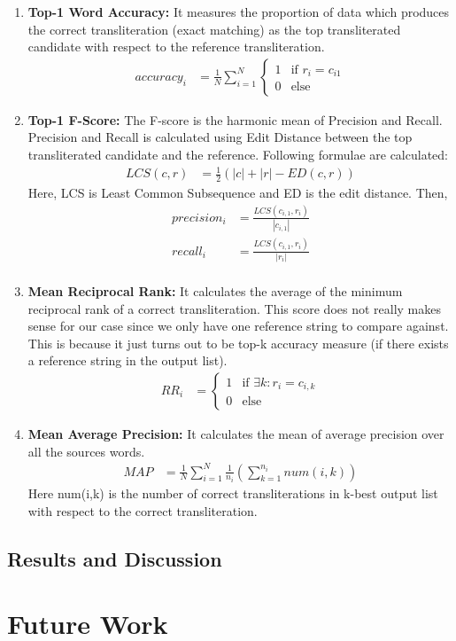 \documentclass[11pt,a4paper]{article}
\begin{document}
\begin{enumerate}
\item \textbf{Top-1 Word Accuracy: } It measures the proportion of data which produces the correct transliteration (exact matching) as the top transliterated candidate with respect to the reference transliteration.
\begin{align*}
	accuracy_i & = \frac{1}{N}\sum_{i=1}^{N}
							\begin{cases}
								1 & \text{if }r_i = c_{i1}\\
								0 & \text{else}
							\end{cases}
\end{align*}
\item \textbf{Top-1 F-Score: } The F-score is the harmonic mean of Precision and Recall. Precision and Recall is calculated using Edit Distance between the top transliterated candidate and the reference. Following formulae are calculated:
\begin{align*}
	LCS(c,r) & = \frac{1}{2}(|c| + |r| - ED(c,r))
\end{align*}
Here, LCS is Least Common Subsequence and ED is the edit distance. Then,
\begin{align*}
	precision_i & = \frac{LCS(c_{i,1}, r_i)}{|c_{i,1}|} \\
	recall_i & = \frac{LCS(c_{i,1}, r_i)}{|r_{i}|} \\
\end{align*}

\item \textbf{Mean Reciprocal Rank: } It calculates the average of the minimum reciprocal rank of a correct transliteration. This score does not really makes sense for our case since we only have one reference string to compare against. This is because it just turns out to be top-k accuracy measure (if there exists a reference string in the output list).
\begin{align*}
	RR_i & = 
		\begin{cases}
			1 & \text{if }\exists k: r_i = c_{i,k} \\
			0 & \text{else}
		\end{cases}
\end{align*}
\item \textbf{Mean Average Precision: } It calculates the mean of average precision over  all the sources words.
\begin{align*}
	MAP & = \frac{1}{N} \sum_{i=1}^{N} \frac{1}{n_i} (\sum_{k=1}^{n_i}num(i,k))
\end{align*}
Here num(i,k) is the number of correct transliterations in k-best output list with respect to the correct transliteration.

\end{enumerate}
\subsection{Results and Discussion}

\section{Future Work}


\end{document}
